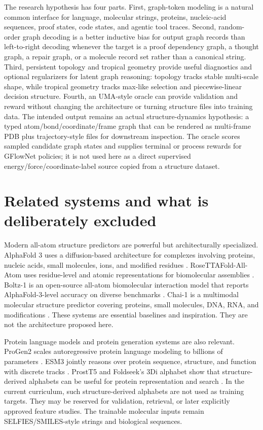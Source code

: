 \documentclass[11pt]{article}
\newcommand{\1}{\mathbf{1}}
\begin{document}
The research hypothesis has four parts. First, graph-token modeling is a natural common interface for language, molecular strings, proteins, nucleic-acid sequences, proof states, code states, and agentic tool traces. Second, random-order graph decoding is a better inductive bias for output graph records than left-to-right decoding whenever the target is a proof dependency graph, a thought graph, a repair graph, or a molecule record set rather than a canonical string. Third, persistent topology and tropical geometry provide useful diagnostics and optional regularizers for latent graph reasoning: topology tracks stable multi-scale shape, while tropical geometry tracks max-like selection and piecewise-linear decision structure. Fourth, an UMA-style oracle can provide validation and reward without changing the architecture or turning structure files into training data. The intended output remains an actual structure-dynamics hypothesis: a typed atom/bond/coordinate/frame graph that can be rendered as multi-frame PDB plus trajectory-style files for downstream inspection. The oracle scores sampled candidate graph states and supplies terminal or process rewards for GFlowNet policies; it is not used here as a direct supervised energy/force/coordinate-label source copied from a structure dataset.

\section{Related systems and what is deliberately excluded}

Modern all-atom structure predictors are powerful but architecturally specialized. AlphaFold 3 uses a diffusion-based architecture for complexes involving proteins, nucleic acids, small molecules, ions, and modified residues \cite{AbramsonAF3_2024}. RoseTTAFold-All-Atom uses residue-level and atomic representations for biomolecular assemblies \cite{KrishnaRFAA2024}. Boltz-1 is an open-source all-atom biomolecular interaction model that reports AlphaFold-3-level accuracy on diverse benchmarks \cite{WohlwendBoltz2025}. Chai-1 is a multimodal molecular structure predictor covering proteins, small molecules, DNA, RNA, and modifications \cite{BoitreaudChai2024,ChaiLab2024}. These systems are essential baselines and inspiration. They are not the architecture proposed here.

Protein language models and protein generation systems are also relevant. ProGen2 scales autoregressive protein language modeling to billions of parameters \cite{NijkampProGen2_2023}. ESM3 jointly reasons over protein sequence, structure, and function with discrete tracks \cite{HayesESM3_2025}. ProstT5 and Foldseek's 3Di alphabet show that structure-derived alphabets can be useful for protein representation and search \cite{HeinzingerProstT5_2023,VanKempenFoldseek2024}. In the current curriculum, such structure-derived alphabets are not used as training targets. They may be reserved for validation, retrieval, or later explicitly approved feature studies. The trainable molecular inputs remain SELFIES/SMILES-style strings and biological sequences.
\end{document}
